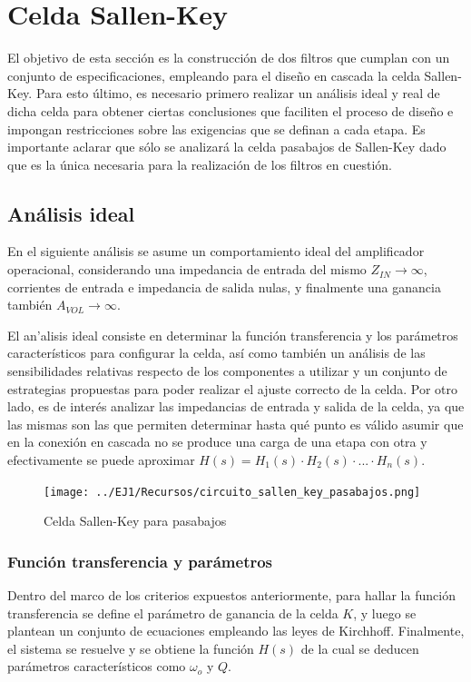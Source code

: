 \section{Celda Sallen-Key}
El objetivo de esta secci\'on es la construcci\'on de dos filtros que cumplan con un conjunto de especificaciones,
empleando para el dise\~no en cascada la celda Sallen-Key. Para esto \'ultimo, es necesario primero realizar un an\'alisis ideal
y real de dicha celda para obtener ciertas conclusiones que faciliten el proceso de dise\~no e impongan restricciones sobre
las exigencias que se definan a cada etapa. Es importante aclarar que s\'olo se analizar\'a la celda pasabajos de Sallen-Key dado
que es la \'unica necesaria para la realizaci\'on de los filtros en cuesti\'on.

\subsection{An\'alisis ideal}
En el siguiente an\'alisis se asume un comportamiento ideal del amplificador operacional, considerando una impedancia de entrada del mismo
$Z_{IN} \rightarrow \infty$, corrientes de entrada e impedancia de salida nulas, y finalmente una ganancia tambi\'en $A_{VOL} \rightarrow \infty$.

El an'alisis ideal consiste en determinar la funci\'on transferencia y los par\'ametros caracter\'isticos para configurar la celda, as\'i como tambi\'en un an\'alisis de las sensibilidades relativas
respecto de los componentes a utilizar y un conjunto de estrategias propuestas para poder realizar el ajuste correcto de la celda. Por otro lado, es de inter\'es analizar las impedancias de entrada y salida de la celda,
ya que las mismas son las que permiten determinar hasta qu\'e punto es v\'alido asumir que en la conexi\'on en cascada no se produce una carga de una etapa con otra y efectivamente se puede aproximar $H(s) = H_1(s) \cdot H_2(s) \cdot ... \cdot H_n(s)$.

\begin{figure}[H]
    \centering
    \texttt{[image: ../EJ1/Recursos/circuito\_sallen\_key\_pasabajos.png]}
    \caption{Celda Sallen-Key para pasabajos}
    \label{circuito_sallen_key_pasabajos}
\end{figure}

\subsubsection{Funci\'on transferencia y par\'ametros}
Dentro del marco de los criterios expuestos anteriormente, para hallar la funci\'on transferencia se define el par\'ametro de ganancia de la celda $K$, y luego
se plantean un conjunto de ecuaciones empleando las leyes de Kirchhoff. Finalmente, el sistema se resuelve y se obtiene la funci\'on $H(s)$ de la cual se deducen par\'ametros
caracter\'isticos como $\omega_o$ y $Q$.

